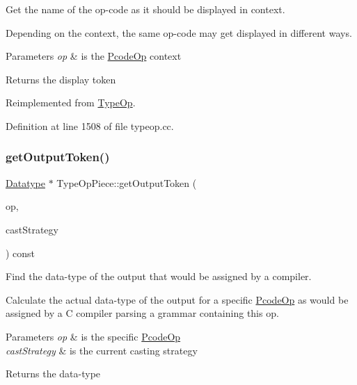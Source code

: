 Get the name of the op-\/code as it should be displayed in context. 

Depending on the context, the same op-\/code may get displayed in different ways. 
\begin{DoxyParams}{Parameters}
{\em op} & is the \mbox{\hyperlink{class_pcode_op}{Pcode\+Op}} context \\
\hline
\end{DoxyParams}
\begin{DoxyReturn}{Returns}
the display token 
\end{DoxyReturn}


Reimplemented from \mbox{\hyperlink{class_type_op_a42a1ffa77f998df24efdb44405b33ac5}{Type\+Op}}.



Definition at line 1508 of file typeop.\+cc.

\mbox{\label{class_type_op_piece_a951c2e42be991699b04945bb1c71de04}} 
\subsubsection{\texorpdfstring{getOutputToken()}{getOutputToken()}}
{\footnotesize\ttfamily \mbox{\hyperlink{class_datatype}{Datatype}} $\ast$ Type\+Op\+Piece\+::get\+Output\+Token (\begin{DoxyParamCaption}\item[{const \mbox{\hyperlink{class_pcode_op}{Pcode\+Op}} $\ast$}]{op,  }\item[{\mbox{\hyperlink{class_cast_strategy}{Cast\+Strategy}} $\ast$}]{cast\+Strategy }\end{DoxyParamCaption}) const\hspace{0.3cm}{\ttfamily [virtual]}}



Find the data-\/type of the output that would be assigned by a compiler. 

Calculate the actual data-\/type of the output for a specific \mbox{\hyperlink{class_pcode_op}{Pcode\+Op}} as would be assigned by a C compiler parsing a grammar containing this op. 
\begin{DoxyParams}{Parameters}
{\em op} & is the specific \mbox{\hyperlink{class_pcode_op}{Pcode\+Op}} \\
\hline
{\em cast\+Strategy} & is the current casting strategy \\
\hline
\end{DoxyParams}
\begin{DoxyReturn}{Returns}
the data-\/type 
\end{DoxyReturn}


